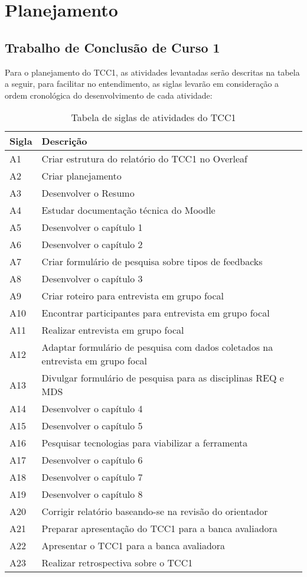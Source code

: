 \chapter{Planejamento}

\section{Trabalho de Conclusão de Curso 1}

Para o planejamento do TCC1, as atividades levantadas serão descritas na tabela a seguir, para facilitar no entendimento, as siglas levarão em consideração a ordem cronológica do desenvolvimento de cada atividade:

\begin{table}[!ht]
\centering
\begin{tabularx}{\textwidth}{|X|X|}
\hline
\textbf{Sigla} & \textbf{Descrição} \\
\hline
A1 & Criar estrutura do relatório do TCC1 no Overleaf \\ \hline
A2 & Criar planejamento  \\\hline
A3 & Desenvolver o Resumo \\\hline
A4 & Estudar documentação técnica do Moodle \\\hline
A5 & Desenvolver o capítulo 1 \\\hline
A6 & Desenvolver o capítulo 2 \\\hline
A7 & Criar formulário de pesquisa sobre tipos de feedbacks \\\hline
A8 & Desenvolver o capítulo 3 \\\hline
A9 & Criar roteiro para entrevista em grupo focal \\\hline
A10 & Encontrar participantes para entrevista em grupo focal \\\hline
A11 & Realizar entrevista em grupo focal \\\hline
A12 & Adaptar formulário de pesquisa com dados coletados na entrevista em grupo focal \\\hline
A13 & Divulgar formulário de pesquisa para as disciplinas REQ e MDS \\\hline
A14 & Desenvolver o capítulo 4 \\\hline
A15 & Desenvolver o capítulo 5 \\\hline
A16 & Pesquisar tecnologias para viabilizar a ferramenta \\\hline
A17 & Desenvolver o capítulo 6 \\\hline
A18 & Desenvolver o capítulo 7 \\\hline
A19 & Desenvolver o capítulo 8 \\\hline
A20 & Corrigir relatório baseando-se na revisão do orientador \\\hline
A21 & Preparar apresentação do TCC1 para a banca avaliadora \\\hline
A22 & Apresentar o TCC1 para a banca avaliadora \\\hline
A23 & Realizar retrospectiva sobre o TCC1 \\\hline
\end{tabularx}
\caption{Tabela de siglas de atividades do TCC1}
\end{table}

